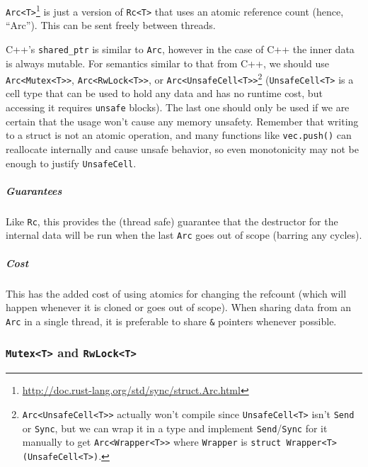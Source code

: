 \documentclass[a4paper,]{book}
\renewcommand{\href}[2]{#2\footnote{\url{#1}}}
\let\oldsubparagraph\subparagraph
\renewcommand{\subparagraph}[1]{\oldsubparagraph{#1}\mbox{}}
\begin{document}
\href{http://doc.rust-lang.org/std/sync/struct.Arc.html}{\texttt{Arc\textless{}T\textgreater{}}}
is just a version of \texttt{Rc\textless{}T\textgreater{}} that uses an
atomic reference count (hence, ``Arc''). This can be sent freely between
threads.

C++'s \texttt{shared\_ptr} is similar to \texttt{Arc}, however in the
case of C++ the inner data is always mutable. For semantics similar to
that from C++, we should use
\texttt{Arc\textless{}Mutex\textless{}T\textgreater{}\textgreater{}},
\texttt{Arc\textless{}RwLock\textless{}T\textgreater{}\textgreater{}},
or
\texttt{Arc\textless{}UnsafeCell\textless{}T\textgreater{}\textgreater{}}\footnote{\texttt{Arc\textless{}UnsafeCell\textless{}T\textgreater{}\textgreater{}}
  actually won't compile since
  \texttt{UnsafeCell\textless{}T\textgreater{}} isn't \texttt{Send} or
  \texttt{Sync}, but we can wrap it in a type and implement
  \texttt{Send}/\texttt{Sync} for it manually to get
  \texttt{Arc\textless{}Wrapper\textless{}T\textgreater{}\textgreater{}}
  where \texttt{Wrapper} is
  \texttt{struct\ Wrapper\textless{}T\textgreater{}(UnsafeCell\textless{}T\textgreater{})}.}
(\texttt{UnsafeCell\textless{}T\textgreater{}} is a cell type that can
be used to hold any data and has no runtime cost, but accessing it
requires \texttt{unsafe} blocks). The last one should only be used if we
are certain that the usage won't cause any memory unsafety. Remember
that writing to a struct is not an atomic operation, and many functions
like \texttt{vec.push()} can reallocate internally and cause unsafe
behavior, so even monotonicity may not be enough to justify
\texttt{UnsafeCell}.

\subparagraph{Guarantees}\label{guarantees-3}

Like \texttt{Rc}, this provides the (thread safe) guarantee that the
destructor for the internal data will be run when the last \texttt{Arc}
goes out of scope (barring any cycles).

\subparagraph{Cost}\label{cost-3}

This has the added cost of using atomics for changing the refcount
(which will happen whenever it is cloned or goes out of scope). When
sharing data from an \texttt{Arc} in a single thread, it is preferable
to share \texttt{\&} pointers whenever possible.

\subsubsection{\texorpdfstring{\texttt{Mutex\textless{}T\textgreater{}}
and
\texttt{RwLock\textless{}T\textgreater{}}}{Mutex\textless{}T\textgreater{} and RwLock\textless{}T\textgreater{}}}\label{mutext-and-rwlockt}
\end{document}
